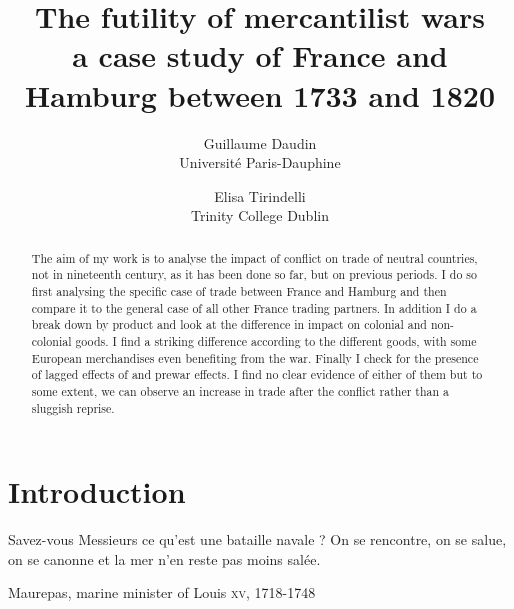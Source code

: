\documentclass[12pt,a4paper,titlepage,english]{article}
\author{
  Guillaume Daudin \\ Université Paris-Dauphine
  \and
  Elisa Tirindelli \\ Trinity College Dublin 
}
\title{The futility of mercantilist wars \\ a case study of France and Hamburg between 1733 and 1820}
\begin{document}
\maketitle



\begin{abstract}
The aim of my work is to analyse the impact of conflict on trade of neutral countries, not in nineteenth century, as it has been done so far, but on previous periods. I do so first analysing the specific case of trade between France and Hamburg and then compare it to the general case of all other France trading partners. In addition I do a break down by product and look at the difference in impact on colonial and non-colonial goods. I find a striking difference according to the different goods, with some European merchandises even benefiting from the war. Finally I check for the presence of lagged effects of and prewar effects. I find no clear evidence of either of them but to some extent, we can observe an increase in trade after the conflict rather than a sluggish reprise. 
\end{abstract}


\section{Introduction}

\epigraph{Savez-vous Messieurs ce qu’est une bataille navale ? On se rencontre, on se salue, on se canonne et la mer n’en reste pas moins salée.}{Maurepas, marine minister of Louis  \textsc{xv}, 1718-1748}
\end{document}
